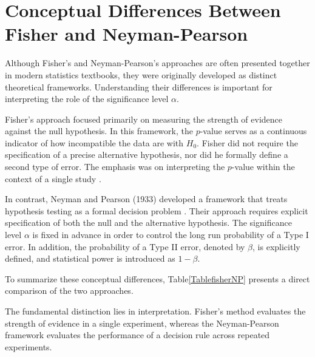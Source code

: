 \section{Conceptual Differences Between Fisher and Neyman-Pearson}

Although Fisher’s and Neyman-Pearson’s approaches are often presented together in modern statistics textbooks, they were originally developed as distinct theoretical frameworks. Understanding their differences is important for interpreting the role of the significance level $\alpha$.

Fisher’s approach focused primarily on measuring the strength of evidence against the null hypothesis. In this framework, the $p$-value serves as a continuous indicator of how incompatible the data are with $H_0$. Fisher did not require the specification of a precise alternative hypothesis, nor did he formally define a second type of error. The emphasis was on interpreting the $p$-value within the context of a single study \cite{Fisher1925}.

In contrast, Neyman and Pearson (1933) developed a framework that treats hypothesis testing as a formal decision problem \cite{NeymanPearson1933}. Their approach requires explicit specification of both the null and the alternative hypothesis. The significance level $\alpha$ is fixed in advance in order to control the long run probability of a Type I error. In addition, the probability of a Type II error, denoted by $\beta$, is explicitly defined, and statistical power is introduced as $1 - \beta$.

To summarize these conceptual differences, Table\ref{TablefisherNP} presents a direct comparison of the two approaches.

The fundamental distinction lies in interpretation. Fisher’s method evaluates the strength of evidence in a single experiment, whereas the Neyman-Pearson framework evaluates the performance of a decision rule across repeated experiments.



